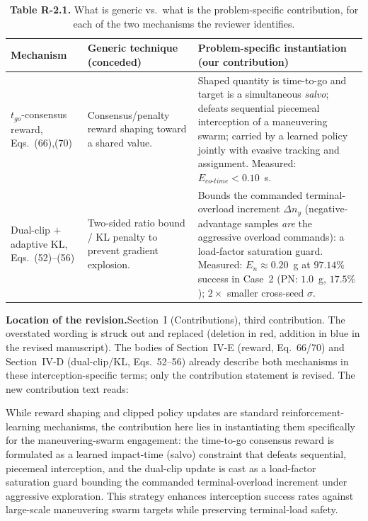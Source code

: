 \documentclass[11pt]{article}
\newcommand{\loc}{\medskip\noindent\textbf{Location of the revision.}\quad}
\begin{document}
\begin{table}[h]
\centering
\captionsetup{font=small}
\caption*{\small\textbf{Table R-2.1.} What is generic vs.\ what is the problem-specific
contribution, for each of the two mechanisms the reviewer identifies.}
\small
\begin{tabular}{@{}p{}p{}p{}@{}}
\toprule
\textbf{Mechanism} & \textbf{Generic technique (conceded)} & \textbf{Problem-specific
instantiation (our contribution)} \\
\midrule
$t_{go}$-consensus reward, Eqs.~(66),(70) &
Consensus/penalty reward shaping toward a shared value. &
Shaped quantity is time-to-go and target is a simultaneous \emph{salvo}; defeats
sequential piecemeal interception of a maneuvering swarm; carried by a learned policy
jointly with evasive tracking and assignment. Measured: $E_{co\text{-}time}<0.10$~s. \\
\addlinespace
Dual-clip $+$ adaptive KL, Eqs.~(52)--(56) &
Two-sided ratio bound / KL penalty to prevent gradient explosion. &
Bounds the commanded terminal-overload increment $\Delta n_y$ (negative-advantage samples
\emph{are} the aggressive overload commands): a load-factor saturation guard. Measured:
$E_n\!\approx\!0.20$~g at $97.14\%$ success in Case~2 (PN: $1.0$~g, $17.5\%$); $2\times$
smaller cross-seed $\sigma$. \\
\bottomrule
\end{tabular}
\end{table}

\loc Section~I (Contributions), third contribution. The overstated wording is struck out
and replaced (deletion in red, addition in blue in the revised manuscript). The bodies of
Section~IV-E (reward, Eq.~66/70) and Section~IV-D (dual-clip/KL, Eqs.~52--56) already
describe both mechanisms in these interception-specific terms; only the contribution
statement is revised. The new contribution text reads:

\begin{manuscripttext}
While reward shaping and clipped policy updates are standard reinforcement-learning
mechanisms, the contribution here lies in instantiating them specifically for the
maneuvering-swarm engagement: the time-to-go consensus reward is formulated as a learned
impact-time (salvo) constraint that defeats sequential, piecemeal interception, and the
dual-clip update is cast as a load-factor saturation guard bounding the commanded
terminal-overload increment under aggressive exploration. This strategy enhances
interception success rates against large-scale maneuvering swarm targets while preserving
terminal-load safety.
\end{manuscripttext}
\end{document}
